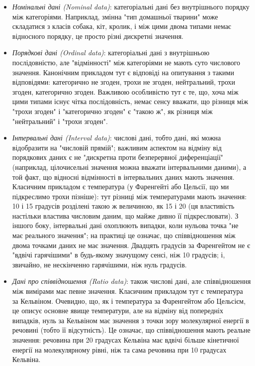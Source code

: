 \begin{itemize}
\item \textit{Номінальні дані (Nominal data)}: категоріальні дані без внутрішнього порядку між категоріями. Наприклад, змінна "тип домашньої тварини" може складатися з класів {собака, кіт, кролик}, і між цими двома типами немає відносного порядку, це просто різні дискретні значення.

\item \textit{Порядкові дані (Ordinal data)}: категоріальні дані з внутрішньою послідовністю, але "відмінності" між категоріями не мають суто числового значення. Канонічним прикладом тут є відповіді на опитування з такими відповідями: {категорично не згоден, трохи не згоден, нейтральний, трохи згоден, категорично згоден}. Важливою особливістю тут є те, що, хоча між цими типами існує чітка послідовність, немає сенсу вважати, що різниця між "трохи згоден" і "категорично згоден" є "такою ж", як різниця між "нейтральний" і "трохи згоден".

\item \textit{Інтервальні дані (Interval data)}: числові дані, тобто дані, які можна відобразити на "числовій прямій"; важливим аспектом на відміну від порядкових даних є не "дискретна проти безперервної диференціації" (наприклад, цілочисельні значення можна вважати інтервальними даними), а той факт, що відносні відмінності в інтервальних даних мають значення. Класичним прикладом є температура (у Фаренгейті або Цельсії, що ми підкреслимо трохи пізніше): тут різниці між температурами мають значення: 10 і 15 градусів розділені такою ж величиною, як 15 і 20 (ця властивість настільки властива числовим даним, що майже дивно її підкреслювати). З іншого боку, інтервальні дані охоплюють випадки, коли нульова точка "не має реального значення"; на практиці це означає, що співвідношення між двома точками даних не має значення. Двадцять градусів за Фаренгейтом не є "вдвічі гарячішими" в будь-якому значущому сенсі, ніж 10 градусів; і, звичайно, не нескінченно гарячішими, ніж нуль градусів.

\item \textit{Дані про співвідношення (Ratio data)}: також числові дані, але співвідношення між вимірами має певне значення. Класичним прикладом тут є температура за Кельвіном. Очевидно, що, як і температура за Фаренгейтом або Цельсієм, це описує основне явище температури, але на відміну від попередніх випадків, нуль за Кельвіном має значення з точки зору молекулярної енергії в речовині (тобто її відсутність). Це означає, що співвідношення мають реальне значення: речовина при 20 градусах Кельвіна має вдвічі більше кінетичної енергії на молекулярному рівні, ніж та сама речовина при 10 градусах Кельвіна.
\end{itemize}

